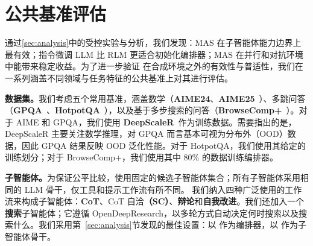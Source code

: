 \section{公共基准评估}
\label{sec:experiemnt}




通过\cref{sec:analysis}中的受控实验与分析，我们发现：MAS 在子智能体能力边界上最有效；指令微调 LLM 比 RLM 更适合初始化编排器；MAS 在并行和对抗环境中能带来稳定收益。为了进一步验证 \ourframework 在合成环境之外的有效性与普适性，我们在一系列涵盖不同领域与任务特征的公共基准上对其进行评估。

\textbf{数据集。}我们考虑五个常用基准，涵盖数学（\textbf{AIME24}、\textbf{AIME25}~\citep{aime2024}）、多跳问答
（\textbf{GPQA}~\cite{rein2023gpqagraduatelevelgoogleproofqa}、\textbf{HotpotQA}~\citep{DBLP:conf/emnlp/Yang0ZBCSM18}），以及基于多步搜索的问答（\textbf{BrowseComp+}~\cite{chen2025BrowseCompPlus}）。对于 AIME 和 GPQA，我们使用 \textbf{DeepScaleR}~\cite{deepscaler2025}作为训练数据。需要指出的是，DeepScaleR 主要关注数学推理，对 GPQA 而言基本可视为分布外（OOD）数据，因此 GPQA 结果反映 OOD 泛化性能。对于 HotpotQA，我们使用其给定的训练划分；对于 BrowseComp+，我们使用其中 80\% 的数据训练编排器。

\textbf{子智能体。}为保证公平比较，\ourframework 使用固定的候选子智能体集合；所有子智能体采用相同的 LLM 骨干，仅工具和提示工作流有所不同。
我们纳入四种广泛使用的工作流来构成子智能体：\textbf{CoT}、CoT 自洽\textbf{（SC）}、\textbf{辩论}和\textbf{自我改进}。我们还加入一个\textbf{搜索}子智能体；它遵循 OpenDeepResearch\cite{langchain_open_deep_research}，以多轮方式自动决定何时搜索以及搜索什么。我们采用第~\ref{sec:analysis}节发现的最佳设置：以 \qwen 作为编排器，以 \ossonetwentylow 作为子智能体骨干。


